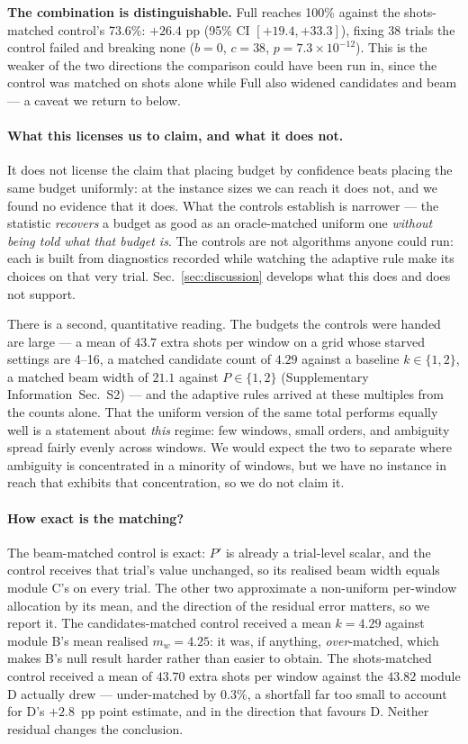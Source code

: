 \documentclass[preprint,11pt]{elsarticle}
\newcommand{\SI}{Supplementary Information}
\newcommand{\SItables}{\SI{}~Sec.~S2}
\begin{document}
\textbf{The combination is distinguishable.} Full reaches 100\% against
the shots-matched control's 73.6\%: $+26.4$ pp (95\% CI $[+19.4,+33.3]$),
fixing 38 trials the control failed and breaking none ($b{=}0$, $c{=}38$,
$p=7.3\times10^{-12}$). This is the weaker of the two directions the
comparison could have been run in, since the control was matched on shots
alone while Full also widened candidates and beam --- a caveat we return
to below.

\paragraph{What this licenses us to claim, and what it does not.} It does
not license the claim that placing budget by confidence beats placing the
same budget uniformly: at the instance sizes we can reach it does not,
and we found no evidence that it does. What the controls establish is
narrower --- the statistic \emph{recovers} a budget as good as an
oracle-matched uniform one \emph{without being told what that budget
is}. The controls are not algorithms anyone could run: each is built from
diagnostics recorded while watching the adaptive rule make its choices on
that very trial. Sec.~\ref{sec:discussion} develops what this does and
does not support.

There is a second, quantitative reading. The budgets the controls were
handed are large --- a mean of $43.7$ extra shots per window on a grid
whose starved settings are 4--16, a matched candidate count of $4.29$
against a baseline $k\in\{1,2\}$, a matched beam width of $21.1$ against
$P\in\{1,2\}$ (\SItables{}) --- and the adaptive rules arrived at these
multiples from the counts alone. That the uniform version of the same
total performs equally well is a statement about \emph{this} regime: few
windows, small orders, and ambiguity spread fairly evenly across windows.
We would expect the two to separate where ambiguity is concentrated in a
minority of windows, but we have no instance in reach that exhibits that
concentration, so we do not claim it.

\paragraph{How exact is the matching?} The beam-matched control is
exact: $P'$ is already a trial-level scalar, and the control receives
that trial's value unchanged, so its realised beam width equals module
C's on every trial. The other two approximate a non-uniform per-window
allocation by its mean, and the direction of the residual error matters,
so we report it. The candidates-matched control received a mean
$k=4.29$ against module B's mean realised $m_w=4.25$: it was, if
anything, \emph{over}-matched, which makes B's null result harder rather
than easier to obtain. The shots-matched control received a mean of
$43.70$ extra shots per window against the $43.82$ module D actually
drew --- under-matched by $0.3\%$, a shortfall far too small to account
for D's $+2.8$~pp point estimate, and in the direction that favours D.
Neither residual changes the conclusion.
\end{document}
